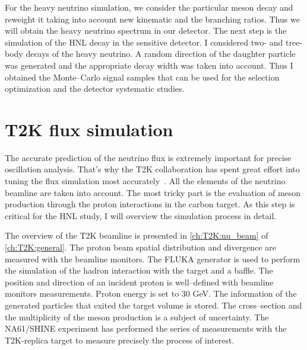 \documentclass[../main.tex]{subfiles}
\begin{document}
For the heavy neutrino simulation, we consider the particular meson decay and reweight it taking into account new kinematic and the branching ratios. Thus we will obtain the heavy neutrino spectrum in our detector. The next step is the simulation of the HNL decay in the sensitive detector. I considered two- and tree-body decays of the heavy neutrino. A random direction of the daughter particle was generated and the appropriate decay width was taken into account. Thus I obtained the Monte--Carlo signal samples that can be used for the selection optimization and the detector systematic studies.

\section{T2K flux simulation}
The accurate prediction of the neutrino flux is extremely important for precise oscillation analysis. That's why the T2K collaboration has spent great effort into tuning the flux simulation most accurately~\cite{Abe2013}. All the elements of the neutrino beamline are taken into account. The most tricky part is the evaluation of meson production through the proton interactions in the carbon target. As this step is critical for the HNL study, I will overview the simulation process in detail.

The overview of the T2K beamline is presented in \autoref{ch:T2K:nu_beam} of \autoref{ch:T2K:general}. The proton beam spatial distribution and divergence are measured with the beamline monitors. The FLUKA generator is used to perform the simulation of the hadron interaction with the target and a baffle. The position and direction of an incident proton is well--defined with beamline monitors measurements. Proton energy is set to 30 GeV. The information of the generated particles that exited the target volume is stored. The cross--section and the multiplicity of the meson production is a subject of uncertainty. The NA61/SHINE experiment has performed the series of measurements with the T2K-replica target to measure precisely the process of interest.
\end{document}

